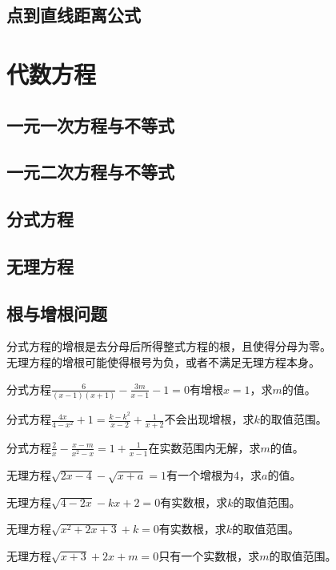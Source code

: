 \section{点到直线距离公式}
\clearpage
\chapter{代数方程}
\section{一元一次方程与不等式}
\clearpage
\section{一元二次方程与不等式}
\clearpage
\section{分式方程}
\clearpage
\section{无理方程}
\clearpage
\section{根与增根问题}
\begin{theorem}
    分式方程的增根是去分母后所得整式方程的根，且使得分母为零。\\
    无理方程的增根可能使得根号为负，或者不满足无理方程本身。
\end{theorem}
\begin{problem}
分式方程$\frac{6}{(x-1)(x+1)}-\frac{3m}{x-1}-1=0$有增根$x=1$，求$m$的值。\\
\end{problem}
\begin{problem}
分式方程$\frac{4x}{4-x^2}+1=\frac{k-k^2}{x-2}+\frac{1}{x+2}$不会出现增根，求$k$的取值范围。 \\
\end{problem}
\begin{problem}
分式方程$\frac{2}{x}-\frac{x-m}{x^2-x}=1+\frac{1}{x-1}$在实数范围内无解，求$m$的值。\\
\end{problem}
\begin{problem}
无理方程$\sqrt{2x-4}-\sqrt{x+a}=1$有一个增根为4，求$a$的值。\\
\end{problem}
\begin{problem}
无理方程$\sqrt{4-2x}-kx+2=0$有实数根，求$k$的取值范围。\\
\end{problem}
\begin{problem}
无理方程$\sqrt{x^2+2x+3}+k=0$有实数根，求$k$的取值范围。\\
\end{problem}
\begin{problem}
无理方程$\sqrt{x+3}+2x+m=0$只有一个实数根，求$m$的取值范围。\\
\end{problem}
\clearpage
